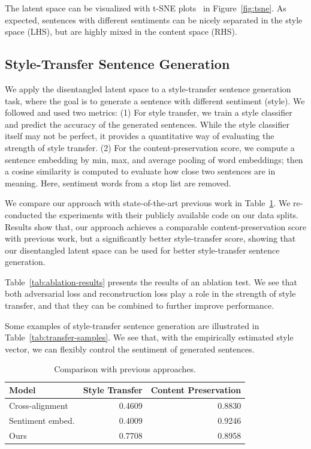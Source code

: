 The latent space can be visualized with t-SNE plots~\cite{maaten2008visualizing} in Figure~\ref{fig:tsne}. As expected, sentences with different sentiments can be nicely separated in the style space (LHS), but are highly mixed in the content space (RHS).


\subsection{Style-Transfer Sentence Generation}

We apply the disentangled latent space to a style-transfer sentence generation task, where the goal is to generate a sentence with different sentiment (style). We followed \cite{fu2017style} and used two metrics: (1) For style transfer, we train a style classifier and predict the accuracy of the generated sentences. While the style classifier itself may not be perfect, it provides a quantitative way of evaluating the strength of style transfer. (2) For the content-preservation score, we compute a sentence embedding by min, max, and average pooling of word embeddings; then a cosine similarity is computed to evaluate how close two sentences are in meaning. Here, sentiment words from a stop list \cite{hu2004mining} are removed.

We compare our approach with state-of-the-art previous work in Table~\ref{tab:comparison-previous}. We re-conducted the experiments with their publicly available code on our data splits.
Results show that, our approach achieves a comparable content-preservation score with previous work, but a significantly better style-transfer score, showing that our disentangled latent space can be used for better style-transfer sentence generation.

Table~\ref{tab:ablation-results} presents the results of an ablation test. We see that both adversarial loss and reconstruction loss play a role in the strength of style transfer, and that they can be combined to further improve performance.

Some examples of style-transfer sentence generation are illustrated in Table~\ref{tab:transfer-samples}. We see that, with the empirically estimated style vector, we can flexibly control the sentiment of generated sentences.

\begin{table}[!t]
	\centering
	\begin{tabular}{| l | r | r | }
		\hline
		\textbf{Model}                        & \textbf{Style Transfer} & \textbf{Content Preservation} \\
		\hline
		\hline
		Cross-alignment \citep{shen2017style} & 0.4609                  & 0.8830                        \\
		\hline
		Sentiment embed. \citep{fu2017style}  & 0.4009                  & 0.9246                        \\
		\hline
		Ours                                  & 0.7708                  & 0.8958                        \\
		\hline
	\end{tabular}
	\caption{Comparison with previous approaches.}
	\label{tab:comparison-previous}
\end{table}


